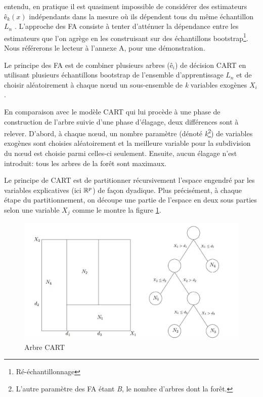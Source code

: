	entendu, en pratique il est quasiment impossible de considérer des estimateurs $ê_k(x)$ indépendants
	dans la mesure où ils dépendent tous du même échantillon \textit{$L_n$} . L’approche des FA consiste à
	tenter d’atténuer la dépendance entre les estimateurs que l’on agrège en les construisant sur des
	échantillons bootstrap\footnote{Ré-échantillonnage}. Nous référerons le lecteur à l'annexe A, pour une démonstration.
	\par
	Le principe des FA est de combiner plusieurs arbres ($ê_i$) de décision CART\cite{BREI84} en utilisant plusieurs échantillons bootstrap de l'ensemble d'apprentissage \textbf{$L_n$} et de choisir aléatoirement à chaque nœud un sous-ensemble de \textit{k} variables exogènes $X_i$.
	
	\par
	 En comparaison avec le modèle CART qui lui procède à une phase de construction de l'arbre suivie d'une phase d'élagage, deux différences sont à relever. D'abord, à chaque nœud, un nombre paramètre (dénoté \textit{k}\footnote{L'autre paramètre des FA étant \textit{B}, le nombre d'arbres dont la forêt.}) de variables exogènes sont choisies aléatoirement et la meilleure variable pour la subdivision du nœud est choisie parmi celles-ci seulement. Ensuite, aucun élagage n'est introduit: tous les arbres de la forêt sont maximaux.\par
	Le principe de CART est de partitionner récursivement l’espace engendré par les variables explicatives (ici $\mathbb{R}^p$) de façon dyadique. Plus précisément, à
	chaque étape du partitionnement, on découpe une partie de l’espace en deux sous parties selon une variable $X_j$ comme le montre la figure \ref{fig:CART}.
	\begin{figure}[h]
	    		\centering
	    		\includegraphics[scale=0.35]{Cart}
	    		\caption{Arbre CART}
	    		\label{fig:CART}
	\end{figure}

